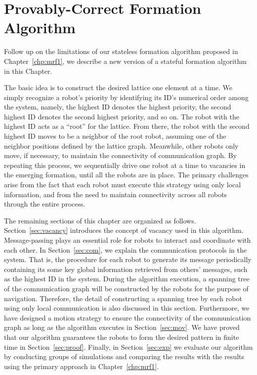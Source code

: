 \chapter{Provably-Correct Formation Algorithm}
\label{chp:mrf2}
Follow up on the limitations of our stateless formation algorithm proposed in Chapter~\ref{chp:mrf1}, we describe a new version of a stateful formation algorithm in this Chapter.


The basic idea is to construct the desired lattice one element at a time. 
%
We simply recognize a robot's priority by identifying its ID's numerical order among the system, namely, the highest ID denotes the highest priority, the second highest ID denotes the second highest priority, and so on.
%
The robot with the highest ID acts as a ``root'' for the lattice.  
%
From there, the robot with the second highest ID moves to be a neighbor of the root robot,
assuming one of the neighbor positions defined by the lattice graph.
%
Meanwhile, other robots only move, if necessary, to maintain the connectivity
of communication graph.
%
By repeating this process, we sequentially drive one robot at a time to vacancies in the emerging formation, until all the robots are in place.
%
The primary challenges arise from the fact that each robot must execute this
strategy using only local information, and from the need to maintain
connectivity across all robots through the entire process.


The remaining sections of this chapter are organized as follows. 
%
Section~\ref{sec:vacancy} introduces the concept of vacancy used in this algorithm. 
% 
Message-passing plays an essential role for robots to interact and coordinate with each other.
%
In Section~\ref{sec:com}, we explain the communication protocols in the system.
%
That is, the procedure for each robot to generate its message periodically containing its some key global information retrieved from others' messages, such as the highest ID in the system.
%
During the algorithm execution, a spanning tree of the communication graph will be constructed by the robots for the purpose of navigation.
%
Therefore, the detail of constructing a spanning tree by each robot using only local communication is also discussed in this section.
%
Furthermore, we have designed a motion strategy to ensure the connectivity of the communication graph as long as the algorithm executes in Section~\ref{sec:mov}.
%
We have proved that our algorithm guarantees the robots to form the desired pattern in finite time in Section~\ref{sec:proof}.
%
Finally, in Section~\ref{sec:exp} we evaluate our algorithm by conducting groups of simulations and comparing the results with the results using the primary approach in Chapter~\ref{chp:mrf1}.


